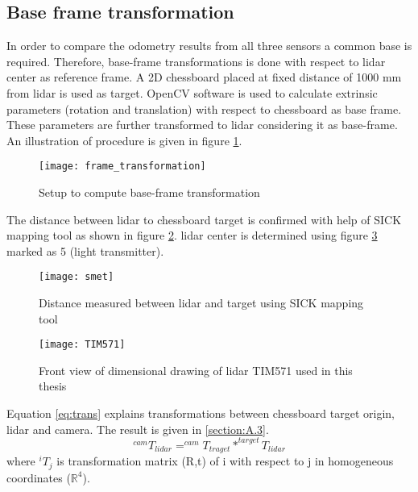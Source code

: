 \subsection{Base frame transformation}
In order to compare the odometry results from all three sensors a common base is required. Therefore, base-frame transformations is done with respect to \acrshort{lidar} center as reference frame. A 2D chessboard placed at fixed distance of 1000 mm from \acrshort{lidar} is used as target. OpenCV software \cite{opencvcalib} is used to calculate extrinsic parameters (rotation and translation) with respect to chessboard as base frame. These parameters are further transformed to \acrshort{lidar} considering it as base-frame. An illustration of procedure is given in figure \ref{fig:transformation}.
\begin{figure}[H]
	\centering
	\texttt{[image: frame\_transformation]}
	\caption{Setup to compute base-frame transformation}
	\label{fig:transformation}
\end{figure}
\noindent The distance between \acrshort{lidar} to chessboard target is confirmed with help of SICK mapping tool as shown in figure \ref{fig:smet}. \acrshort{lidar} center is determined using figure \ref{fig:tim} marked as 5 (light transmitter).
\begin{figure}[H]
	\centering
	\texttt{[image: smet]}
	\caption{Distance measured between \acrshort{lidar} and target using SICK mapping tool}
	\label{fig:smet}
\end{figure}
\begin{figure}[H]
	\centering
	\texttt{[image: TIM571]}
	\caption{Front view of dimensional drawing of \acrshort{lidar} TIM571 used in this thesis \cite{sick}}
	\label{fig:tim}
\end{figure}
\noindent Equation \ref{eq:trans} explains transformations between chessboard target origin, \acrshort{lidar} and camera. The result is given in \ref{section:A.3}.
\begin{equation*}
\label{eq:trans}
  ^{cam}T_{lidar}  = ^{cam}T_{traget} * ^{target}T_{lidar} 
\end{equation*} 
where $ ^{i}T_{j} $ is transformation matrix (R,t) of i with respect to j in homogeneous coordinates ($ \mathbb{R}^{4} $).

